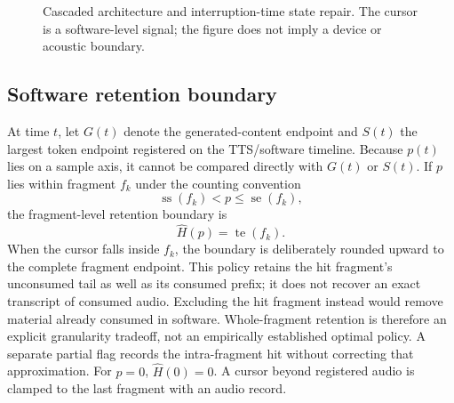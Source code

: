 \begin{figure}[t]
\centering
{}
\caption{Cascaded architecture and interruption-time state repair. The cursor is a software-level signal; the figure does not imply a device or acoustic boundary.}
\label{fig:architecture}
\end{figure}

\subsection{Software retention boundary}

At time $t$, let $G(t)$ denote the generated-content endpoint and $S(t)$ the largest token endpoint registered on the TTS/software timeline. Because $p(t)$ lies on a sample axis, it cannot be compared directly with $G(t)$ or $S(t)$. If $p$ lies within fragment $f_k$ under the counting convention
\begin{equation}
\operatorname{ss}(f_k)<p\leq\operatorname{se}(f_k),
\label{eq:cursor-hit}
\end{equation}
the fragment-level retention boundary is
\begin{equation}
\widehat H(p)=\operatorname{te}(f_k).
\label{eq:retention}
\end{equation}
When the cursor falls inside $f_k$, the boundary is deliberately rounded upward to the complete fragment endpoint. This policy retains the hit fragment's unconsumed tail as well as its consumed prefix; it does not recover an exact transcript of consumed audio. Excluding the hit fragment instead would remove material already consumed in software. Whole-fragment retention is therefore an explicit granularity tradeoff, not an empirically established optimal policy. A separate partial flag records the intra-fragment hit without correcting that approximation. For $p=0$, $\widehat H(0)=0$. A cursor beyond registered audio is clamped to the last fragment with an audio record.

